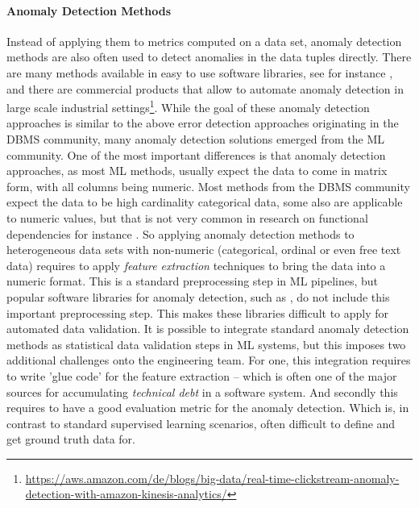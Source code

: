 \paragraph{Anomaly Detection Methods}
Instead of applying them to metrics computed on a data set, anomaly detection methods are also often used to detect anomalies in the data tuples directly. There are many methods available in easy to use software libraries, see for instance \cite{Zhao2019}, and there are commercial products that allow to automate anomaly detection in large scale industrial settings\footnote{\url{https://aws.amazon.com/de/blogs/big-data/real-time-clickstream-anomaly-detection-with-amazon-kinesis-analytics/}}. While the goal of these anomaly detection approaches is similar to the above error detection approaches originating in the DBMS community, many anomaly detection solutions emerged from the ML community. One of the most important differences is that anomaly detection approaches, as most ML methods, usually expect the data to come in matrix form, with all columns being numeric. Most methods from the DBMS community expect the data to be high cardinality categorical data, some also are applicable to numeric values, but that is not very common in research on functional dependencies for instance \cite{Papenbrock2015}. So applying anomaly detection methods to heterogeneous data sets with non-numeric (categorical, ordinal or even free text data) requires to apply {\em feature extraction} techniques to bring the data into a numeric format. This is a standard preprocessing step in ML pipelines, but popular software libraries for anomaly detection, such as  \cite{Zhao2019}, do not include this important preprocessing step. This makes these libraries difficult to apply for automated data validation. It is possible to integrate standard anomaly detection methods as statistical data validation steps in ML systems, but this imposes two additional challenges onto the engineering team. For one, this integration requires to write 'glue code' for the feature extraction -- which is often one of the major sources for accumulating {\em technical debt} in a software system. And secondly this requires to have a good evaluation metric for the anomaly detection. Which is, in contrast to standard supervised learning scenarios, often difficult to define and get ground truth data for.

